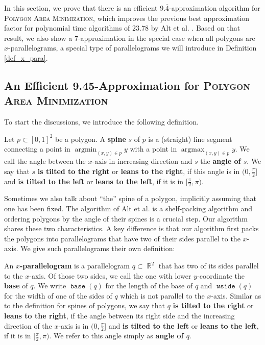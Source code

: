 \documentclass[a4paper,UKenglish,cleveref, autoref, thm-restate]{lipics_v2021}
\DeclareMathOperator{\argmin}{argmin}
\DeclareMathOperator{\argmax}{argmax}
\DeclareMathOperator{\base}{\mathtt{base}}
\DeclareMathOperator{\wside}{\mathtt{wside}}
\DeclareMathOperator{\R}{\mathbb{R}}
\begin{document}
In this section, we prove that there is an efficient $9.\overline{4}$-approximation algorithm for \textsc{Polygon Area Minimization}, which improves the previous best approximation factor for polynomial time algorithms of $23.78$ by Alt et al. \cite{alt_17,alt_17_corrigendum}. Based on that result, we also show a $7$-approximation in the special case when all polygons are $x$-parallelograms, a special type of parallelograms we will introduce in Definition \ref{def_x_para}.

\subsection{An Efficient 9.45-Approximation for \textsc{Polygon Area Minimization}}
To start the discussions, we introduce the following definition.

\begin{definition}
\label{def_spine}
Let $p \subset [0,1]^2$ be a polygon. A \textbf{spine} $s$ of $p$ is a (straight) line segment connecting a point in $\argmin_{(x,y) \in p} y$ with a point in $\argmax_{(x,y) \in p} y$. We call the angle between the $x$-axis in increasing direction and $s$ the \textbf{angle of $s$}. We say that $s$ \textbf{is tilted to the right} or \textbf{leans to the right}, if this angle is in $(0,\frac{\pi}{2}$] and \textbf{is tilted to the left} or \textbf{leans to the left}, if it is in $[\frac{\pi}{2},\pi)$.
\end{definition}

Sometimes we also talk about ``the'' spine of a polygon, implicitly assuming that one has been fixed. The algorithm of Alt et al. is a shelf-packing algorithm and ordering polygons by the angle of their spines is a crucial step. Our algorithm shares these two characteristics. A key difference is that our algorithm first packs the polygons into parallelograms that have two of their sides parallel to the $x$-axis. We give such parallelograms their own definition:

\begin{definition}
\label{def_x_para}
An \textbf{$x$-parallelogram} is a parallelogram $q \subset \R^2$ that has two of its sides parallel to the $x$-axis. Of those two sides, we call the one with lower $y$-coordinate the \textbf{base} of $q$. We write $\base(q)$ for the length of the base of $q$ and $\wside(q)$ for the width of one of the sides of $q$ which is not parallel to the $x$-axis. Similar as to the definition for spines of polygons, we say that $q$ \textbf{is tilted to the right} or \textbf{leans to the right}, if the angle between its right side and the increasing direction of the $x$-axis is in $(0,\frac{\pi}{2}$] and \textbf{is tilted to the left} or \textbf{leans to the left}, if it is in $[\frac{\pi}{2},\pi)$. We refer to this angle simply as \textbf{angle of $q$}.
\end{definition}
\end{document}
